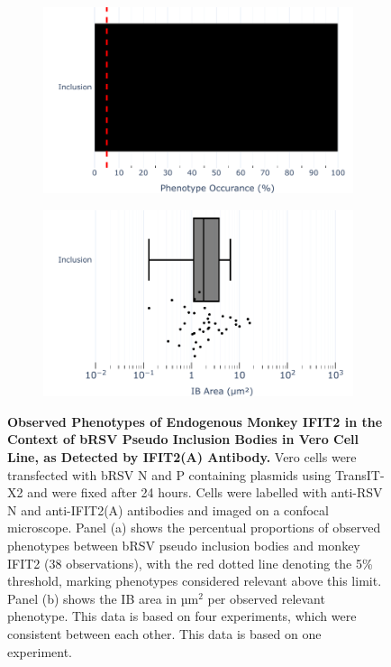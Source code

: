 \begin{figure}
    \begin{subfigure}{0.495\textwidth}
        \caption{}
        \includegraphics[width=1\linewidth]{09. Chapter 4/Figs/01. pIB/03. IFIT2/02. IFIT2A/07. bar_i2a_vero_bnbp.pdf} 
    \end{subfigure}
    \begin{subfigure}{0.495\textwidth}
        \caption{}
        \includegraphics[width=1\linewidth]{09. Chapter 4/Figs/01. pIB/03. IFIT2/02. IFIT2A/08. box_i2a_vero_bnbp.pdf}
    \end{subfigure}
    \caption[Observed Phenotypes of Endogenous Monkey IFIT2 in the Context of bRSV Pseudo Inclusion Bodies in Vero Cell Line, as Detected by IFIT2(A) Antibody.]{\textbf{Observed Phenotypes of Endogenous Monkey IFIT2 in the Context of bRSV Pseudo Inclusion Bodies in Vero Cell Line, as Detected by IFIT2(A) Antibody.} Vero cells were transfected with bRSV N and P containing plasmids using TransIT-X2 and were fixed after 24 hours. Cells were labelled with anti-RSV N and anti-IFIT2(A) antibodies and imaged on a confocal microscope. Panel (a) shows the percentual proportions of observed phenotypes between bRSV pseudo inclusion bodies and monkey IFIT2 (38 observations), with the red dotted line denoting the 5\% threshold, marking phenotypes considered relevant above this limit. Panel (b) shows the IB area in \(\mbox{µm}^2\) per observed relevant phenotype. This data is based on four experiments, which were consistent between each other.
This data is based on one experiment.}
    \label{fig:Observed Phenotypes of Endogenous Monkey IFIT2 in the Context of bRSV Pseudo Inclusion Bodies in Vero Cell Line, as Detected by IFIT2(A) Antibody}
\end{figure}

